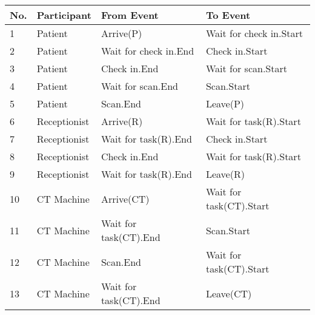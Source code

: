 \begin{tabular}{p{0.6cm}>{\raggedright\arraybackslash}p{2.4cm}>{\raggedright\arraybackslash}p{5.9cm}>{\raggedright\arraybackslash}p{5.9cm}}
\toprule
No. & Participant & From Event & To Event       \\ \midrule
1 & Patient  & Arrive(P) & Wait for check in.Start \\
2 & Patient & Wait for check in.End & Check in.Start\\
3 & Patient & Check in.End & Wait for scan.Start\\
4 & Patient & Wait for scan.End & Scan.Start\\
5 & Patient & Scan.End & Leave(P)\\
6 & Receptionist  & Arrive(R)& Wait for task(R).Start\\
7 & Receptionist  & Wait for task(R).End & Check in.Start\\
8 & Receptionist  & Check in.End & Wait for task(R).Start\\
9 & Receptionist  & Wait for task(R).End& Leave(R)\\
10& CT Machine  & Arrive(CT)& Wait for task(CT).Start\\
11& CT Machine  & Wait for task(CT).End & Scan.Start\\
12& CT Machine & Scan.End & Wait for task(CT).Start\\
13& CT Machine  & Wait for task(CT).End& Leave(CT)\\\bottomrule
\end{tabular}
